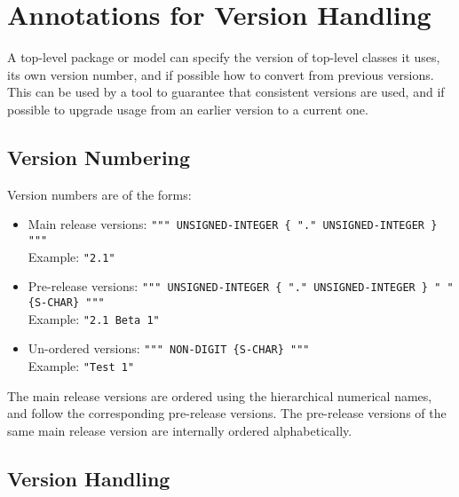 \section{Annotations for Version Handling}\label{annotations-for-version-handling}

A top-level package or model can specify the version of top-level
classes it uses, its own version number, and if possible how to convert
from previous versions. This can be used by a tool to guarantee that
consistent versions are used, and if possible to upgrade usage from an
earlier version to a current one.

\subsection{Version Numbering}\label{version-numbering}

Version numbers are of the forms:
\begin{itemize}
\item
  Main release versions: \lstinline[language=grammar]!""" UNSIGNED-INTEGER { "." UNSIGNED-INTEGER } """!\\
  Example: \lstinline!"2.1"!
\item
  Pre-release versions: \lstinline[language=grammar]!""" UNSIGNED-INTEGER { "." UNSIGNED-INTEGER } " " {S-CHAR} """!\\
  Example: \lstinline!"2.1 Beta 1"!
\item
  Un-ordered versions: \lstinline[language=grammar]!""" NON-DIGIT {S-CHAR} """!\\
  Example: \lstinline!"Test 1"!
\end{itemize}

The main release versions are ordered using the hierarchical numerical
names, and follow the corresponding pre-release versions. The
pre-release versions of the same main release version are internally
ordered alphabetically.

\subsection{Version Handling}\label{version-handling}

